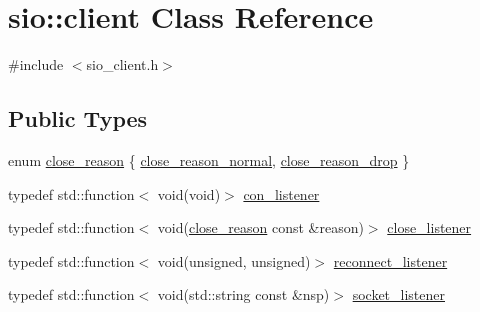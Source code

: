 \hypertarget{classsio_1_1client}{}\section{sio\+:\+:client Class Reference}
\label{classsio_1_1client}


{\ttfamily \#include $<$sio\+\_\+client.\+h$>$}

\subsection*{Public Types}
\begin{DoxyCompactItemize}
\item 
enum \hyperlink{classsio_1_1client_a5c8b6c424134f40b3e9bf488b4961aaf}{close\+\_\+reason} \{ \hyperlink{classsio_1_1client_a5c8b6c424134f40b3e9bf488b4961aafa3d0f427321567c717587a633793c5198}{close\+\_\+reason\+\_\+normal}, 
\hyperlink{classsio_1_1client_a5c8b6c424134f40b3e9bf488b4961aafa2066afdaa7a1383099c527b5c1aaa777}{close\+\_\+reason\+\_\+drop}
 \}
\item 
typedef std\+::function$<$ void(void)$>$ \hyperlink{classsio_1_1client_a23951b626c91c87e866d4e966ec828fa}{con\+\_\+listener}
\item 
typedef std\+::function$<$ void(\hyperlink{classsio_1_1client_a5c8b6c424134f40b3e9bf488b4961aaf}{close\+\_\+reason} const  \&reason)$>$ \hyperlink{classsio_1_1client_a9736334c566e7dcc6201ea5629024390}{close\+\_\+listener}
\item 
typedef std\+::function$<$ void(unsigned, unsigned)$>$ \hyperlink{classsio_1_1client_a62a35170a39347cb1e56e2105badcad1}{reconnect\+\_\+listener}
\item 
typedef std\+::function$<$ void(std\+::string const  \&nsp)$>$ \hyperlink{classsio_1_1client_a02b43cadd1588575ae2465042452cabf}{socket\+\_\+listener}
\end{DoxyCompactItemize}

